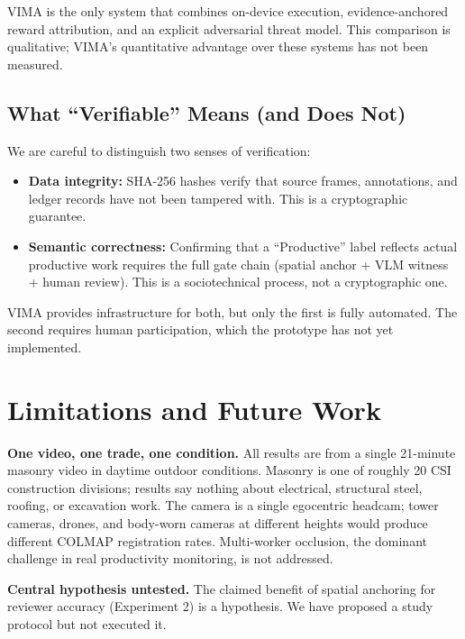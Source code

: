\documentclass[sigconf,nonacm]{acmart}
\begin{document}
VIMA is the only system that combines on-device execution, evidence-anchored reward attribution, and an explicit adversarial threat model.
This comparison is qualitative; VIMA's quantitative advantage over these systems has not been measured.

\subsection{What ``Verifiable'' Means (and Does Not)}

We are careful to distinguish two senses of verification:
\begin{itemize}[leftmargin=1.4em,itemsep=0.1em]
\item \textbf{Data integrity:} SHA-256 hashes verify that source frames, annotations, and ledger records have not been tampered with. This is a cryptographic guarantee.
\item \textbf{Semantic correctness:} Confirming that a ``Productive'' label reflects actual productive work requires the full gate chain (spatial anchor + VLM witness + human review). This is a sociotechnical process, not a cryptographic one.
\end{itemize}
VIMA provides infrastructure for both, but only the first is fully automated.
The second requires human participation, which the prototype has not yet implemented.

\section{Limitations and Future Work}
\label{sec:limitations}

\textbf{One video, one trade, one condition.}
All results are from a single 21-minute masonry video in daytime outdoor conditions.
Masonry is one of roughly 20 CSI construction divisions; results say nothing about electrical, structural steel, roofing, or excavation work.
The camera is a single egocentric headcam; tower cameras, drones, and body-worn cameras at different heights would produce different COLMAP registration rates.
Multi-worker occlusion, the dominant challenge in real productivity monitoring, is not addressed.

\textbf{Central hypothesis untested.}
The claimed benefit of spatial anchoring for reviewer accuracy (Experiment 2) is a hypothesis.
We have proposed a study protocol but not executed it.
\end{document}
